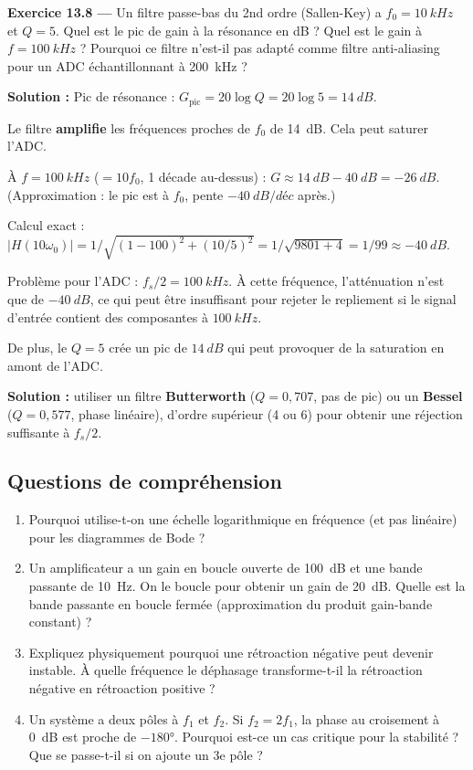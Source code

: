 \documentclass[12pt,a4paper,twoside]{book}
\begin{document}
\textbf{Exercice 13.8 ---} Un filtre passe-bas du 2nd ordre (Sallen-Key) a $f_0 = \SI{10}{kHz}$ et $Q = 5$. Quel est le pic de gain à la résonance en dB ? Quel est le gain à $f = \SI{100}{kHz}$ ? Pourquoi ce filtre n'est-il pas adapté comme filtre anti-aliasing pour un ADC échantillonnant à \SI{200}{kHz} ?

\begin{pratique}
\textbf{Solution :} Pic de résonance : $G_{\text{pic}} = 20\log Q = 20\log 5 = \SI{14}{dB}$.

Le filtre \textbf{amplifie} les fréquences proches de $f_0$ de \SI{14}{dB}. Cela peut saturer l'ADC.

À $f = \SI{100}{kHz}$ ($= 10f_0$, 1 décade au-dessus) : $G \approx \SI{14}{dB} - \SI{40}{dB} = \SI{-26}{dB}$. (Approximation : le pic est à $f_0$, pente $-\SI{40}{dB/déc}$ après.)

Calcul exact : $|H(10\omega_0)| = 1/\sqrt{(1-100)^2 + (10/5)^2} = 1/\sqrt{9801+4} = 1/99 \approx \SI{-40}{dB}$.

Problème pour l'ADC : $f_s/2 = \SI{100}{kHz}$. À cette fréquence, l'atténuation n'est que de $\SI{-40}{dB}$, ce qui peut être insuffisant pour rejeter le repliement si le signal d'entrée contient des composantes à $\SI{100}{kHz}$.

De plus, le $Q = 5$ crée un pic de $\SI{14}{dB}$ qui peut provoquer de la saturation en amont de l'ADC.

\textbf{Solution :} utiliser un filtre \textbf{Butterworth} ($Q = 0{,}707$, pas de pic) ou un \textbf{Bessel} ($Q = 0{,}577$, phase linéaire), d'ordre supérieur (4 ou 6) pour obtenir une réjection suffisante à $f_s/2$.
\end{pratique}

\subsection*{Questions de compréhension}

\begin{enumerate}[nosep]
\item Pourquoi utilise-t-on une échelle logarithmique en fréquence (et pas linéaire) pour les diagrammes de Bode ?
\item Un amplificateur a un gain en boucle ouverte de \SI{100}{dB} et une bande passante de \SI{10}{Hz}. On le boucle pour obtenir un gain de \SI{20}{dB}. Quelle est la bande passante en boucle fermée (approximation du produit gain-bande constant) ?
\item Expliquez physiquement pourquoi une rétroaction négative peut devenir instable. À quelle fréquence le déphasage transforme-t-il la rétroaction négative en rétroaction positive ?
\item Un système a deux pôles à $f_1$ et $f_2$. Si $f_2 = 2f_1$, la phase au croisement à \SI{0}{dB} est proche de $-180°$. Pourquoi est-ce un cas critique pour la stabilité ? Que se passe-t-il si on ajoute un 3e pôle ?
\end{enumerate}
\end{document}
